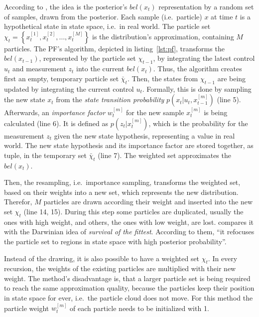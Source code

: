 According to \citet{thrun:prob_robo}, the idea is the posterior's $bel(x_t)$ representation by a random set of samples, drawn from the posterior. Each sample (i.e.\ particle) $x$ at time $t$ is a hypothetical state in state space, i.e.\ in real world. The particle set $\chi_t = \left\{ x^{[1]}_t, x^{[2]}_t, \ldots, x^{[M]}_t \right\}$ is the distribution's approximation, containing $M$ particles. The \ac{PF}'s algorithm, depicted in listing~\ref{lst:pf}, transforms the $bel(x_{t-1})$, represented by the particle set $\chi_{t-1}$, by integrating the latest control $u_t$ and measurement $z_t$ into the current $bel(x_t)$. Thus, the algorithm creates first an empty, temporary particle set $\bar{\chi}_t$. Then, the states from $\chi_{t-1}$ are being updated by integrating the current control $u_t$. Formally, this is done by sampling the new state $x_t$ from the \emph{state transition probability} $p(x_t|u_t, x^{[m]}_{t-1})$ (line 5). Afterwards, an \emph{importance factor} $w^{[m]}_t$ for the new sample $x^{[m]}_t$ is being calculated (line 6). It is defined as $p(z_t|x^{[m]}_t)$, which is the probability for the measurement $z_t$ given the new state hypothesis, representing a value in real world. The new state hypothesis and its importance factor are stored together, as tuple, in the temporary set $\bar{\chi}_t$ (line 7). The weighted set approximates the $bel(x_t)$.

Then, the resampling, i.e.\ importance sampling, transforms the weighted set, based on their weights into a new set, which represents the new distribution. Therefor, $M$ particles are drawn according their weight and inserted into the new set $\chi_t$ (line 14, 15). During this step some particles are duplicated, usually the ones with high weight, and others, the ones with low weight, are lost. \citet{thrun:prob_robo} compares it with the Darwinian idea of \emph{survival of the fittest}. According to them, ``it refocuses the particle set to regions in state space with high posterior probability''.
 
Instead of the drawing, it is also possible to have a weighted set $\chi_t$. In every recursion, the weights of the existing particles are multiplied with their new weight. The method's disadvantage is, that a larger particle set is being required to reach the same approximation quality, because the particles keep their position in state space for ever, i.e.\ the particle cloud does not move. For this method the particle weight $w^{[m]}_t$ of each particle needs to be initialized with 1.
 
